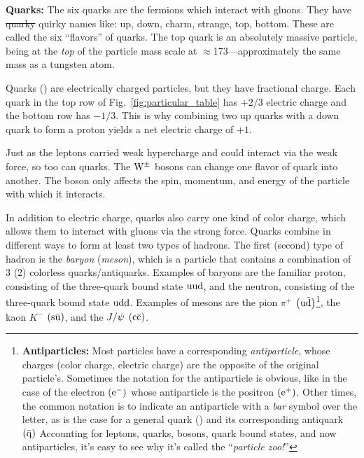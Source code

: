 

\textbf{Quarks:}
The six quarks are the fermions which interact with gluons.
They have \st{quarky} quirky names like: 
up, down, charm, strange, top, bottom. 
These are called the six ``flavors'' of quarks.
The top quark is an absolutely massive particle, being at the \emph{top} of the particle mass scale at $\approx$173\GeV---approximately the same mass as a tungsten atom.

Quarks (\Pq) are electrically charged particles, but they have fractional charge.
Each quark in the top row of Fig.~\ref{fig:particular_table} has $+2/3$ electric charge and the bottom row has $-1/3$.
This is why combining two up quarks with a down quark to form a proton yields a net electric charge of $+1$.

Just as the leptons carried weak hypercharge and could interact via the weak force, so too can quarks. 
The $\mathrm{W}^{\pm}$ bosons can change one flavor of quark into another.
The \PZ boson only affects the spin, momentum, and energy of the particle with which it interacts.

In addition to electric charge, quarks also carry one kind of color charge, which allows them to interact with gluons via the strong force. 
Quarks combine in different ways to form at least two types of hadrons.
The first (second) type of hadron is the \emph{baryon} (\emph{meson}), which is a particle that contains a combination of 3 (2) colorless quarks/antiquarks.
Examples of baryons are the familiar proton, consisting of the three-quark bound state $\mathrm{u} \mathrm{u} \mathrm{d}$, and the neutron, consisting of the three-quark bound state $\mathrm{u} \mathrm{d} \mathrm{d}$.
Examples of mesons are the pion $\pi^+$ $\left(\mathrm{u} \bar{\mathrm{d}} \right)$\footnote{
    \textbf{Antiparticles:} Most particles have a corresponding \emph{antiparticle}, whose charges (\eg color charge, electric charge) are the opposite of the original particle's.
    Sometimes the notation for the antiparticle is obvious, like in the case of the electron $\left( \mathrm{e}^- \right)$ whose antiparticle is the positron $\left( \mathrm{e}^+ \right)$.
    Other times, the common notation is to indicate an antiparticle with a \emph{bar} symbol over the letter, as is the case for a general quark (\Pq) and its corresponding antiquark $\left( \bar{\mathrm{q}} \right)$
    Accounting for leptons, quarks, bosons, quark bound states, and now antiparticles, it's easy to see why it's called the ``\emph{particle zoo!}''
}, the kaon $K^-$ $\left(\mathrm{s} \bar{\mathrm{u}} \right)$, and the $J / \psi$ $\left( \mathrm{c} \bar{\mathrm{c}} \right)$.

